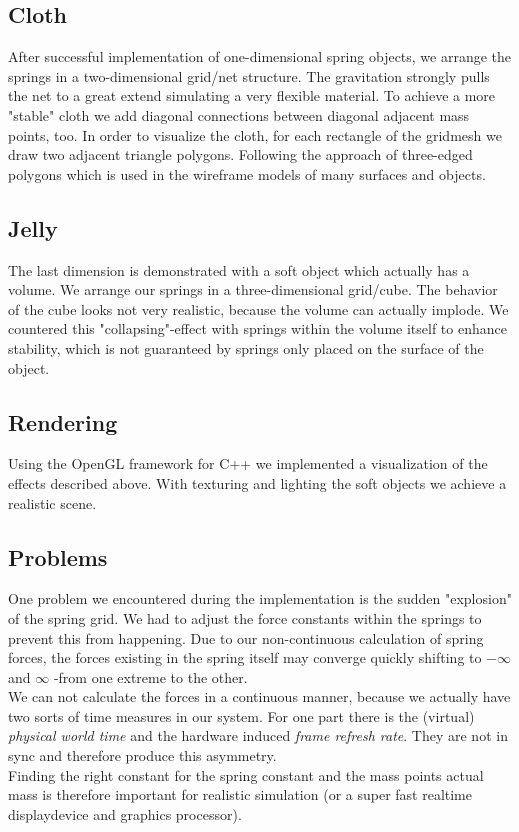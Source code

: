 \documentclass[11pt]{article}
\begin{document}
\subsection{Cloth}
After successful implementation of one-dimensional spring objects, we arrange the springs in a two-dimensional grid/net structure. The gravitation strongly pulls the net to a great extend simulating a very flexible material. To achieve a more "stable" cloth we add diagonal connections between diagonal adjacent mass points, too. In order to visualize the cloth, for each rectangle of the gridmesh we draw two adjacent triangle polygons. Following the approach of three-edged polygons which is used in the wireframe models of many surfaces and objects.
\subsection{Jelly}
The last dimension is demonstrated with a soft object which actually has a volume. We arrange our springs in a three-dimensional grid/cube. The behavior of the cube looks not very realistic, because the volume can actually implode. We countered this "collapsing"-effect with springs within the volume itself to enhance stability, which is not guaranteed by springs only placed on the surface of the object.
\subsection{Rendering}
Using the OpenGL framework for C++ we implemented a visualization of the effects described above. With texturing and lighting the soft objects we achieve a realistic scene.
\subsection{Problems}
One problem we encountered during the implementation is the sudden "explosion" of the spring grid. We had to adjust the force constants within the springs to prevent this from happening. Due to our non-continuous calculation of spring forces, the forces existing in the spring itself may converge quickly shifting to $-\infty$ and $\infty$ -from one extreme to the other.\\[1em]
We can not calculate the forces in a continuous manner, because we actually have two sorts of time measures in our system. For one part there is the (virtual) \textit{physical world time} and the hardware induced \textit{frame refresh rate}. They are not in sync and therefore produce this asymmetry.\\[1em]
Finding the right constant for the spring constant and the mass points actual mass is therefore important for realistic simulation (or a super fast realtime displaydevice and graphics processor).
%
\end{document}
